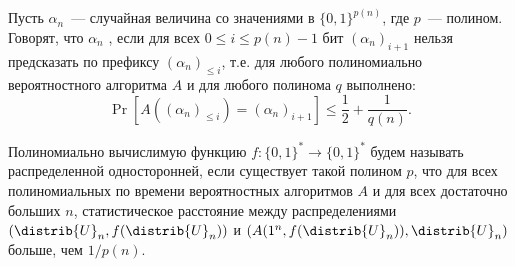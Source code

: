 





\begin{definition*}
    Пусть $\alpha_n$~--- случайная величина со значениями в $\{0, 1\}^{p(n)}$, где $p$~---
    полином. Говорят, что $\alpha_n$ , если для всех $0 \le i \le p(n) - 1$
    бит $(\alpha_n)_{i + 1}$ нельзя предсказать по префиксу $(\alpha_n)_{\le i}$, т.е. для любого
    полиномиально вероятностного алгоритма $A$ и для любого полинома $q$ выполнено:
    $$
        \Pr[A((\alpha_n)_{\le i}) = (\alpha_n)_{i + 1}] \le \frac{1}{2} + \frac{1}{q(n)}.
    $$
\end{definition*}


\begin{definition*}
    Полиномиально вычислимую функцию $f\colon \{0, 1\}^* \to \{0, 1\}^*$ будем называть распределенной
    односторонней, если существует такой полином $p$, что для всех полиномиальных по времени
    вероятностных алгоритмов $A$ и для всех достаточно больших $n$, статистическое расстояние между
    распределениями $(\distrib{U}_n, f(\distrib{U}_n))$ и $(A(1^n, f(\distrib{U}_n)), \distrib{U}_n)$
    больше, чем $1 / p(n)$.
\end{definition*}






